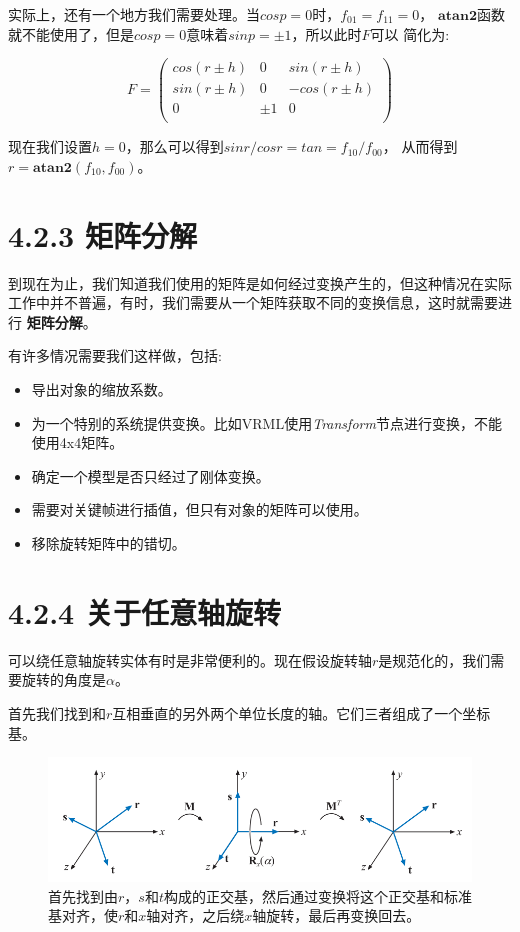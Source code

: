 \documentclass{ctexart}
\begin{document}
实际上，还有一个地方我们需要处理。当$cosp=0$时，$f_{01}=f_{11}=0$，
$\textbf{atan2}$函数就不能使用了，但是$cosp=0$意味着$sinp=\pm 1$，所以此时$F$可以
简化为:

\begin{equation}
	\label{ExtEuler3}
	F=\left(
		\begin{array}{ccc}
			cos(r\pm h) &   0   & sin(r\pm h)\\
			sin(r\pm h) &   0   & -cos(r\pm h)\\
			0			&  \pm 1& 			 0\\
		\end{array}
	\right)
\end{equation}

现在我们设置$h=0$，那么可以得到$sinr/cosr=tan=f_{10}/f_{00}$，
从而得到$r=\textbf{atan2}(f_{10},f_{00})$。

\section{4.2.3 矩阵分解}

到现在为止，我们知道我们使用的矩阵是如何经过变换产生的，但这种情况在实际工作中并不普遍，有时，我们需要从一个矩阵获取不同的变换信息，这时就需要进行
\textbf{矩阵分解}。

有许多情况需要我们这样做，包括:

\begin{itemize}
	\item 导出对象的缩放系数。
	\item 为一个特别的系统提供变换。比如VRML使用\emph{Transform}节点进行变换，不能使用4x4矩阵。
	\item 确定一个模型是否只经过了刚体变换。
	\item 需要对关键帧进行插值，但只有对象的矩阵可以使用。
	\item 移除旋转矩阵中的错切。
\end{itemize}

\section{4.2.4 关于任意轴旋转}

可以绕任意轴旋转实体有时是非常便利的。现在假设旋转轴$r$是规范化的，我们需要旋转的角度是$\alpha$。

首先我们找到和$r$互相垂直的另外两个单位长度的轴。它们三者组成了一个坐标基。

\begin{figure}
	\centering
	\includegraphics[scale=0.8]{4-7.png}
	\caption{首先找到由$r$，$s$和$t$构成的正交基，然后通过变换将这个正交基和标准基对齐，使$r$和$x$轴对齐，之后绕$x$轴旋转，最后再变换回去。}
	\label{EulerFigure}
\end{figure}
\end{document}
